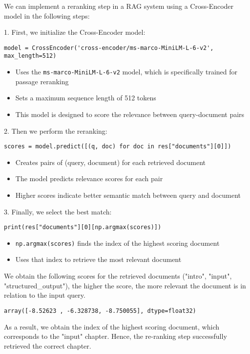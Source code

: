 We can implement a reranking step in a RAG system using a Cross-Encoder model in the following steps:

1. First, we initialize the Cross-Encoder model:
\begin{verbatim}
model = CrossEncoder('cross-encoder/ms-marco-MiniLM-L-6-v2', max_length=512)
\end{verbatim}
\begin{itemize}
    \item Uses the \texttt{ms-marco-MiniLM-L-6-v2} model, which is specifically trained for passage reranking
    \item Sets a maximum sequence length of 512 tokens
    \item This model is designed to score the relevance between query-document pairs
\end{itemize}
2. Then we perform the reranking:
\begin{verbatim}
scores = model.predict([(q, doc) for doc in res["documents"][0]])
\end{verbatim}
\begin{itemize}
    \item Creates pairs of (query, document) for each retrieved document
    \item The model predicts relevance scores for each pair
    \item Higher scores indicate better semantic match between query and document
\end{itemize}

3. Finally, we select the best match:
\begin{verbatim}
print(res["documents"][0][np.argmax(scores)])
\end{verbatim}
\begin{itemize}
    \item \texttt{np.argmax(scores)} finds the index of the highest scoring document
    \item Uses that index to retrieve the most relevant document
\end{itemize}

We obtain the following scores for the retrieved documents ("intro", "input", "structured\_output"), the higher the score, the more relevant the document is in relation to the input query.

\begin{verbatim}
array([-8.52623 , -6.328738, -8.750055], dtype=float32)
\end{verbatim}

As a result, we obtain the index of the highest scoring document, which corresponds to the "input" chapter. Hence, the re-ranking step successfully retrieved the correct chapter.

